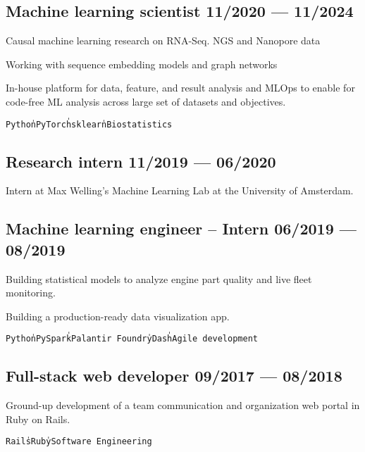 \documentclass[letter,10pt]{article}
\begin{document}
\subsection{{Machine learning scientist \hfill 11/2020 --- 11/2024}}
\begin{zitemize}
\item Causal machine learning research on RNA-Seq. NGS and Nanopore data
\item Working with sequence embedding models and graph networks
\item In-house platform for data, feature, and result analysis and MLOps to enable for code-free ML analysis across large set of datasets and objectives.
\item[] \texttt{Python{\|}PyTorch{\|}sklearn{\|}Biostatistics}
\end{zitemize}

\subsection{{Research intern \hfill 11/2019 --- 06/2020}}
\begin{zitemize}
\item Intern at Max Welling's Machine Learning Lab at the University of Amsterdam.
\end{zitemize}

\subsection{{Machine learning engineer -- Intern \hfill 06/2019 --- 08/2019}}
\begin{zitemize}
\item Building statistical models to analyze engine part quality and live fleet monitoring.
\item Building a production-ready data visualization app.
\item[] \texttt{Python{\|}PySpark{\|}Palantir Foundry{\|}Dash{\|}Agile development}
\end{zitemize}


\subsection{{Full-stack web developer \hfill 09/2017 --- 08/2018}}
\begin{zitemize}
\item Ground-up development of a team communication and organization web portal in Ruby on Rails.
\item[] \texttt{Rails{\|}Ruby{\|}Software Engineering}
\end{zitemize}
\end{document}
